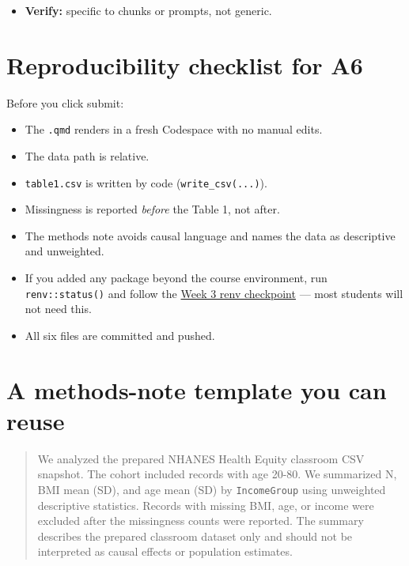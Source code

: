 \documentclass[
  letterpaper,
  DIV=11,
  numbers=noendperiod,
  oneside]{scrreprt}
\providecommand{\tightlist}{%
  \setlength{\itemsep}{0pt}\setlength{\parskip}{0pt}}
\begin{document}
\begin{itemize}
\tightlist
\item
  \textbf{Verify:} specific to chunks or prompts, not generic.
\end{itemize}

\section*{Reproducibility checklist for
A6}\label{reproducibility-checklist-for-a6}


Before you click submit:

\begin{itemize}
\tightlist
\item
  The \texttt{.qmd} renders in a fresh Codespace with no manual edits.
\item
  The data path is relative.
\item
  \texttt{table1.csv} is written by code (\texttt{write\_csv(...)}).
\item
  Missingness is reported \emph{before} the Table 1, not after.
\item
  The methods note avoids causal language and names the data as
  descriptive and unweighted.
\item
  If you added any package beyond the course environment, run
  \texttt{renv::status()} and follow the
  \hyperref[minimal-renv-checkpoint]{Week 3 renv checkpoint} --- most
  students will not need this.
\item
  All six files are committed and pushed.
\end{itemize}

\section*{A methods-note template you can
reuse}\label{a-methods-note-template-you-can-reuse}


\begin{quote}
We analyzed the prepared NHANES Health Equity classroom CSV snapshot.
The cohort included records with age 20-80. We summarized N, BMI mean
(SD), and age mean (SD) by \texttt{IncomeGroup} using unweighted
descriptive statistics. Records with missing BMI, age, or income were
excluded after the missingness counts were reported. The summary
describes the prepared classroom dataset only and should not be
interpreted as causal effects or population estimates.
\end{quote}
\end{document}
